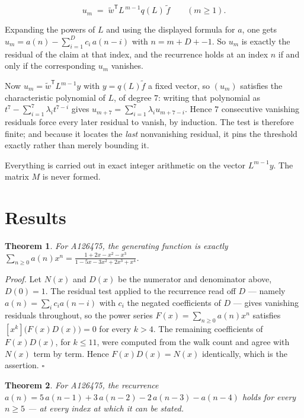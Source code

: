 \documentclass[11pt]{article}
\newtheorem{theorem}{Theorem}
\theoremstyle{definition}
\begin{document}
\[u_m \;=\; \tilde w^{\mathsf T} L^{\,m-1} q(L)\,\tilde f \qquad (m \ge 1).\]

Expanding the powers of $L$ and using the displayed formula for $a$, one gets $u_m = a(n) - \sum_{i=1}^{D} c_i\,a(n-i)$ with $n = m + D + -1$. So $u_m$ is exactly the residual of the claim at that index, and the recurrence holds at an index $n$ if and only if the corresponding $u_m$ vanishes.

Now $u_m = \tilde w^{\mathsf T} L^{m-1} y$ with $y = q(L)\tilde f$ a fixed vector, so $(u_m)$ satisfies the characteristic polynomial of $L$, of degree $7$: writing that polynomial as $t^{7} - \sum_{i=1}^{7} \lambda_i t^{7-i}$ gives $u_{m+7} = \sum_{i=1}^{7} \lambda_i u_{m+7-i}$. Hence $7$ consecutive vanishing residuals force every later residual to vanish, by induction. The test is therefore finite; and because it locates the {\itshape last} nonvanishing residual, it pins the threshold exactly rather than merely bounding it.

Everything is carried out in exact integer arithmetic on the vector $L^{m-1}y$. The matrix $M$ is never formed.

\section{Results}

\begin{theorem} For A126475, the generating function is exactly $\sum_{n\ge 0} a(n)x^n = \frac{1 + 2x - x^{2} - x^{3}}{1 - 5x - 3x^{2} + 2x^{3} + x^{4}}$.\end{theorem}

{\itshape Proof.} Let $N(x)$ and $D(x)$ be the numerator and denominator above, $D(0)=1$. The residual test applied to the recurrence read off $D$ --- namely $a(n) = \sum_i c_i a(n-i)$ with $c_i$ the negated coefficients of $D$ --- gives vanishing residuals throughout, so the power series $F(x)=\sum_{n\ge 0}a(n)x^n$ satisfies $[x^k]\bigl(F(x)D(x)\bigr) = 0$ for every $k > 4$. The remaining coefficients of $F(x)D(x)$, for $k \le 11$, were computed from the walk count and agree with $N(x)$ term by term. Hence $F(x)D(x) = N(x)$ identically, which is the assertion. $\square$

\begin{theorem} For A126475, the recurrence $a(n) = 5\,a(n-1) + 3\,a(n-2) - 2\,a(n-3) - a(n-4)$ holds for every $n \ge 5$ --- at every index at which it can be stated.\end{theorem}
\end{document}
